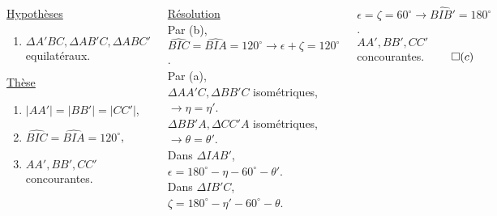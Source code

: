 \documentclass[10pt]{beamer}
\def \deg {^{\circ}}
\begin{document}
{\begin{columns}[t]
\begin{tcolorbox}[basic]
				    \smallskip
				    \underline{Hypothèses} 
				    \begin{enumerate}
				    \item $\Delta A'BC,\Delta AB'C,\Delta ABC'$ equilatéraux.
				    \end{enumerate}
							      
				    \underline{Thèse}
				    \renewcommand{\theenumi}{\alph{enumi})}
				    \begin{enumerate}
				    \item $|AA'|=|BB'| = |CC'|$,
				    \item $\widehat{BIC}=\widehat{BIA}=120\deg$,
				    \item $AA',BB',CC'$ concourantes.
				    \end{enumerate}

				    \end{tcolorbox}
		
		
		\centering
		
		\underline{Résolution}\\ \flushleft
		Par (b), \\ \smallskip
		$\widehat{BIC}=\widehat{BIA}=120\deg \rightarrow \epsilon + \zeta=120\deg$. \\ \medskip
		Par (a), \\ \smallskip 
		$\Delta AA'C, \Delta BB'C$ isométriques, \\ \smallskip
		$\rightarrow \eta = \eta '$.  \\ \medskip
		$\Delta BB'A, \Delta CC'A$ isométriques, \\ \smallskip
		$\rightarrow \theta = \theta '$.  \\ \medskip
		Dans $\Delta IAB'$, \\ \smallskip
		$\epsilon = 180\deg - \eta - 60\deg - \theta'$. \\ \medskip
		Dans $\Delta IB'C$, \\ \smallskip
		$\zeta = 180\deg - \eta ' - 60\deg - \theta$. \\ \bigskip
		
		$\epsilon = \zeta = 60\deg\rightarrow \widehat{BIB'}=180\deg$. \\ \bigskip 
		$AA',BB',CC'$ concourantes. \hfill $\qed(c)$
		
		
		
		
	   \end{columns}   
    }
  
\end{document}
